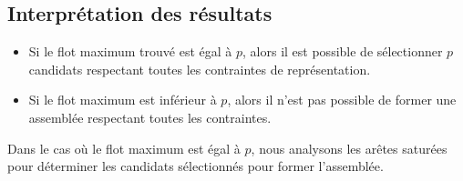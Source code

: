 \documentclass[11pt, a4paper]{article}
\begin{document}
\subsection{Interprétation des résultats}
\begin{itemize}
    \item Si le flot maximum trouvé est égal à $p$, alors il est possible de sélectionner $p$ candidats respectant toutes les contraintes de représentation.
    \item Si le flot maximum est inférieur à $p$, alors il n'est pas possible de former une assemblée respectant toutes les contraintes.
\end{itemize}

Dans le cas où le flot maximum est égal à $p$, nous analysons les arêtes saturées pour déterminer les candidats sélectionnés pour former l'assemblée.
\end{document}
